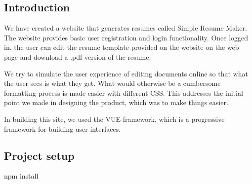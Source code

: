 \documentclass[11pt]{article}
\begin{document}
\begin{spacing}{1.0}
		\tableofcontents
	\newpage	
	\section{Introduction}
	
	We have created a website that generates resumes called Simple Resume Maker. The website provides basic user registration and login functionality. Once logged in, the user can edit the resume template provided on the website on the web page and download a .pdf version of the resume.
	
	We try to simulate the user experience of editing documents online so that what the user sees is what they get. What would otherwise be a cumbersome formatting process is made easier with different CSS. This addresses the initial point we made in designing the product, which was to make things easier.
	
	In building this site, we used the VUE framework, which is a progressive framework for building user interfaces. 
	
	\begin{center}
		
	\end{center}

	
	\subsection{Project setup}
		npm install

\end{spacing}
\end{document}
